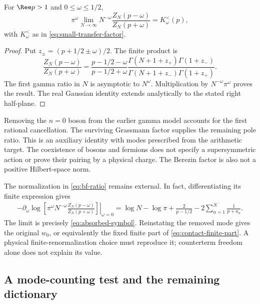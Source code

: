 \begin{proposition}
\label{prop:bf-ratio}
For $\Ree p>1$ and $0\le\omega\le1/2$,
\begin{equation}\label{eq:bf-ratio}
 \pi^\omega\lim_{N\to\infty}N^{-\omega}
 \frac{Z_N(p-\omega)}{Z_N(p+\omega)}
 =K_\omega^{<}(p),
\end{equation}
with $K_\omega^{<}$ as in \eqref{eq:small-transfer-factor}.
\end{proposition}
\begin{proof}
Put $z_\pm=(p+1/2\pm\omega)/2$.
The finite product is
\begin{equation}
 \frac{Z_N(p-\omega)}{Z_N(p+\omega)}
 =
 \frac{p-1/2-\omega}{p-1/2+\omega}
 \frac{\Gamma(N+1+z_+)\Gamma(1+z_-)}
      {\Gamma(N+1+z_-)\Gamma(1+z_+)}.
\end{equation}
The first gamma ratio in $N$ is asymptotic to $N^\omega$.
Multiplication by $N^{-\omega}\pi^\omega$ proves the result.
The real Gaussian identity extends analytically to the
stated right half-plane.
\end{proof}

Removing the $n=0$ boson from the earlier gamma model
accounts for the first rational cancellation. The surviving
Grassmann factor supplies the remaining pole ratio.
This is an auxiliary identity with modes prescribed from
the arithmetic target. The coexistence of bosons and
fermions does not specify a supersymmetric action or prove
their pairing by a physical charge. The Berezin factor is
also not a positive Hilbert-space norm.

The normalization in \eqref{eq:bf-ratio} remains external.
In fact, differentiating its finite expression gives
\begin{align}
 -\left.\partial_\omega\log\left[
 \pi^\omega N^{-\omega}
 \frac{Z_N(p-\omega)}{Z_N(p+\omega)}\right]\right|_{\omega=0}
 =\log N-\log\pi+\frac2{p-1/2}
       -2\sum_{n=1}^N\frac1{p+a_n}.
\end{align}
The limit is precisely \eqref{eq:absorbed-symbol}. Reinstating
the removed mode gives the original $w_0$, or equivalently
the fixed finite part of \eqref{eq:contact-finite-part}.
A physical finite-renormalization choice must reproduce it;
counterterm freedom alone does not explain its value.

\subsection{A mode-counting test and the remaining dictionary}
\label{subsec:mode-count}

